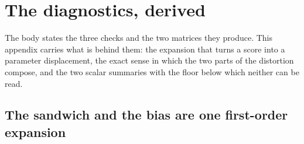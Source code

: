 %
%

\begin{appendixbox}
\label{app:diagnostics}
\section*{The diagnostics, derived}

The body states the three checks and the two matrices they produce. This appendix carries what is
behind them: the expansion that turns a score into a parameter displacement, the exact sense in
which the two parts of the distortion compose, and the two scalar summaries with the floor below
which neither can be read.

\subsection*{The sandwich and the bias are one first-order expansion}


\end{appendixbox}
